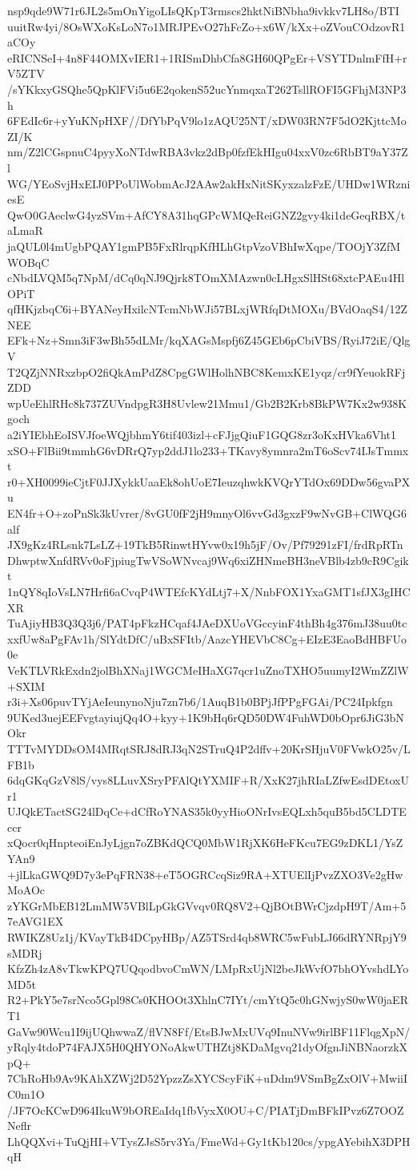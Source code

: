 nsp9qde9W71r6JL2s5mOnYigoLIsQKpT3rmscs2hktNiBNbha9ivkkv7LH8o/BTI
uuitRw4yi/8OsWXoKsLoN7o1MRJPEvO27hFcZo+x6W/kXx+oZVouCOdzovR1aCOy
eRICNSeI+4n8F44OMXvIER1+1RISmDhbCfa8GH60QPgEr+VSYTDnlmFfH+rV5ZTV
/sYKkxyGSQhe5QpKlFVi5u6E2qokenS52ucYnmqxaT262TsllROFI5GFhjM3NP3h
6FEdIc6r+yYuKNpHXF//DfYbPqV9lo1zAQU25NT/xDW03RN7F5dO2KjttcMoZI/K
nm/Z2lCGspnuC4pyyXoNTdwRBA3vkz2dBp0fzfEkHIgu04xxV0zc6RbBT9aY37Zl
WG/YEoSvjHxEIJ0PPoUlWobmAcJ2AAw2akHxNitSKyxzalzFzE/UHDw1WRzniesE
QwO0GAeclwG4yzSVm+AfCY8A31hqGPcWMQeReiGNZ2gvy4ki1deGeqRBX/taLmaR
jaQUL0l4mUgbPQAY1gmPB5FxRlrqpKfHLhGtpVzoVBhIwXqpe/TOOjY3ZfMWOBqC
cNbdLVQM5q7NpM/dCq0qNJ9Qjrk8TOmXMAzwn0cLHgxSlHSt68xtcPAEu4HlOPiT
qfHKjzbqC6i+BYANeyHxilcNTcmNbWJi57BLxjWRfqDtMOXu/BVdOaqS4/12ZNEE
EFk+Nz+Smn3iF3wBh55dLMr/kqXAGsMspfj6Z45GEb6pCbiVBS/RyiJ72iE/QlgV
T2QZjNNRxzbpO2fiQkAmPdZ8CpgGWlHolhNBC8KemxKE1yqz/cr9fYeuokRFjZDD
wpUeEhlRHc8k737ZUVndpgR3H8Uvlew21Mmu1/Gb2B2Krb8BkPW7Kx2w938Kgoch
a2iYIEbhEoISVJfoeWQjbhmY6tif403izl+cFJjgQiuF1GQG8zr3oKxHVka6Vht1
xSO+FlBii9tmmhG6vDRrQ7yp2ddJ1lo233+TKavy8ymnra2mT6oScv74IJsTmmxt
r0+XH0099ieCjtF0JJXykkUaaEk8ohUoE7IeuzqhwkKVQrYTdOx69DDw56gvaPXu
EN4fr+O+zoPnSk3kUvrer/8vGU0fF2jH9mnyOl6vvGd3gxzF9wNvGB+ClWQG6alf
JX9gKz4RLsnk7LsLZ+19TkB5RinwtHYvw0x19h5jF/Ov/Pf79291zFI/frdRpRTn
DhwptwXnfdRVv0oFjpiugTwVSoWNvcaj9Wq6xiZHNmeBH3neVBlb4zb9cR9Cgikt
1nQY8qIoVsLN7Hrfi6aCvqP4WTEfcKYdLtj7+X/NnbFOX1YxaGMT1sfJX3gIHCXR
TuAjiyHB3Q3Q3j6/PAT4pFkzHCqaf4JAeDXUoVGccyinF4thBh4g376mJ38uu0tc
xxfUw8aPgFAv1h/SlYdtDfC/uBxSFItb/AazcYHEVbC8Cg+EIzE3EaoBdHBFUo0e
VeKTLVRkExdn2jolBhXNaj1WGCMeIHaXG7qcr1uZnoTXHO5uumyI2WmZZlW+SXIM
r3i+Xs06puvTYjAeIeunynoNju7zn7b6/1AuqB1b0BPjJfPPgFGAi/PC24Ipkfgn
9UKed3uejEEFvgtayiujQq4O+kyy+1K9bHq6rQD50DW4FuhWD0bOpr6JiG3bNOkr
TTTvMYDDsOM4MRqtSRJ8dRJ3qN2STruQ4P2dffv+20KrSHjuV0FVwkO25v/LFB1b
6dqGKqGzV8lS/vys8LLuvXSryPFAlQtYXMIF+R/XxK27jhRIaLZfwEsdDEtoxUr1
UJQkETactSG24lDqCe+dCfRoYNAS35k0yyHioONrIvsEQLxh5quB5bd5CLDTEccr
xQocr0qHnpteoiEnJyLjgn7oZBKdQCQ0MbW1RjXK6HeFKcu7EG9zDKL1/YsZYAn9
+jlLkaGWQ9D7y3ePqFRN38+eT5OGRCcqSiz9RA+XTUElIjPvzZXO3Ve2gHwMoAOc
zYKGrMbEB12LmMW5VBlLpGkGVvqv0RQ8V2+QjBOtBWrCjzdpH9T/Am+57eAVG1EX
RWIKZ8Uz1j/KVayTkB4DCpyHBp/AZ5TSrd4qb8WRC5wFubLJ66dRYNRpjY9sMDRj
KfzZh4zA8vTkwKPQ7UQqodbvoCmWN/LMpRxUjNl2beJkWvfO7bhOYvshdLYoMD5t
R2+PkY5e7srNco5Gpl98Cs0KHOOt3XhlnC7IYt/cmYtQ5c0hGNwjyS0wW0jaERT1
GaVw90Wcu1I9ijUQhwwaZ/flVN8Ff/EtsBJwMxUVq9InuNVw9irlBF11FlqgXpN/
yRqly4tdoP74FAJX5H0QHYONoAkwUTHZtj8KDaMgvq21dyOfgnJiNBNaorzkXpQ+
7ChRoHb9Av9KAhXZWj2D52YpzzZsXYCScyFiK+uDdm9VSmBgZxOlV+MwiiIC0m1O
/JF7OcKCwD964IkuW9bOREaIdq1fbVyxX0OU+C/PIATjDmBFkIPvz6Z7OOZNeflr
LhQQXvi+TuQjHI+VTysZJsS5rv3Ya/FmeWd+Gy1tKb120cs/ypgAYebihX3DPHqH
